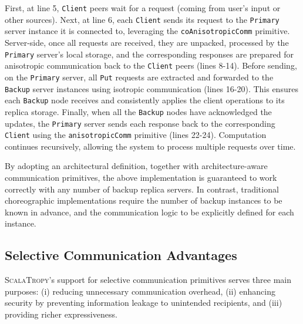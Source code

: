 \documentclass[runningheads]{llncs}
\newcommand{\ourLang}{\textsc{ScalaTropy}}
\newcommand{\code}[1]{\lstinline[style=scala3,basicstyle=\ttfamily\small\color{vscLightText}]{#1}}
\newcommand{\diff}[1]{{#1}}
\begin{document}
First, at line 5, \code{Client} peers wait for a request (coming from user's input or other sources).
%
Next, at line 6, each \code{Client} sends its request to the \code{Primary} server instance it is connected to, leveraging the \code{coAnisotropicComm} primitive.
%
Server-side, once all requests are received, they are unpacked, processed by the \code{Primary} server's local storage, and the corresponding responses are prepared for anisotropic communication back to the \code{Client} peers (lines 8-14).
%
Before sending, on the \code{Primary} server, all \code{Put} requests are extracted and forwarded to the \code{Backup} server instances using isotropic communication (lines 16-20).
%
This ensures each \code{Backup} node receives and consistently applies the client operations to its replica storage.
%
Finally, when all the \code{Backup} nodes have acknowledged the updates, the \code{Primary} server sends each response back to the corresponding \code{Client} using the \code{anisotropicComm} primitive (lines 22-24).
%
Computation continues recursively, 
allowing the system to process multiple requests over time.

By adopting an architectural definition, together with architecture-aware communication primitives,
the above implementation is guaranteed to work correctly with any number of backup replica servers.
%
In contrast, traditional choreographic implementations require the number of backup instances to be known in advance, 
and the communication logic to be explicitly defined for each instance.

\subsection{Selective Communication Advantages}

\ourLang{}'s support for selective communication primitives serves \diff{three} main purposes: 
(i) reducing unnecessary communication overhead, 
(ii) enhancing security by preventing information leakage to unintended recipients,
\diff{and (iii) providing richer expressiveness}.
\end{document}
